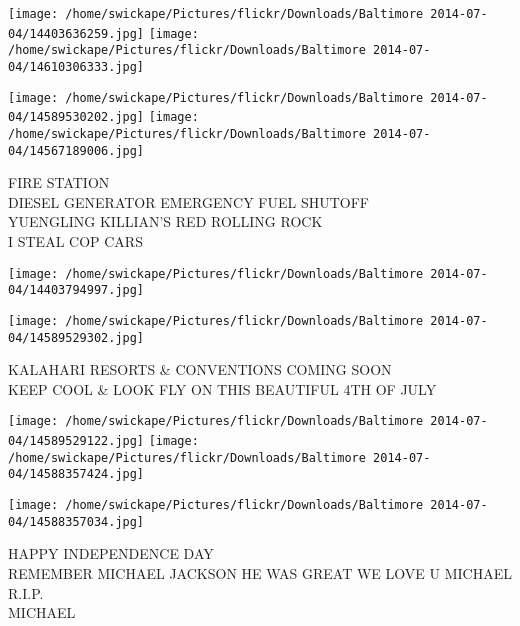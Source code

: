 \documentclass[10pt,letterpaper]{article}
\begin{document}
\texttt{[image: /home/swickape/Pictures/flickr/Downloads/Baltimore 2014-07-04/14403636259.jpg]}
\texttt{[image: /home/swickape/Pictures/flickr/Downloads/Baltimore 2014-07-04/14610306333.jpg]}

\texttt{[image: /home/swickape/Pictures/flickr/Downloads/Baltimore 2014-07-04/14589530202.jpg]}
\texttt{[image: /home/swickape/Pictures/flickr/Downloads/Baltimore 2014-07-04/14567189006.jpg]}

FIRE STATION\\
DIESEL GENERATOR EMERGENCY FUEL SHUTOFF\\
YUENGLING KILLIAN'S RED ROLLING ROCK\\
I STEAL COP CARS
\pagebreak

\texttt{[image: /home/swickape/Pictures/flickr/Downloads/Baltimore 2014-07-04/14403794997.jpg]}

\vspace{0.25in}
\texttt{[image: /home/swickape/Pictures/flickr/Downloads/Baltimore 2014-07-04/14589529302.jpg]}

KALAHARI RESORTS \& CONVENTIONS COMING SOON\\
KEEP COOL \& LOOK FLY ON THIS BEAUTIFUL 4TH OF JULY
\pagebreak

\texttt{[image: /home/swickape/Pictures/flickr/Downloads/Baltimore 2014-07-04/14589529122.jpg]}
\texttt{[image: /home/swickape/Pictures/flickr/Downloads/Baltimore 2014-07-04/14588357424.jpg]}

\texttt{[image: /home/swickape/Pictures/flickr/Downloads/Baltimore 2014-07-04/14588357034.jpg]}

HAPPY INDEPENDENCE DAY\\
REMEMBER MICHAEL JACKSON HE WAS GREAT WE LOVE U MICHAEL R.I.P.\\
MICHAEL
\pagebreak
\end{document}
